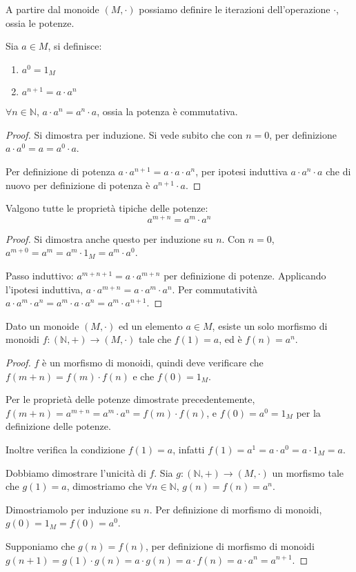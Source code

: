\begin{defn}[Potenze]
A partire dal monoide $(M, \cdot)$ possiamo definire le iterazioni dell'operazione $\cdot$, ossia le potenze.

Sia $ a \in M$, si definisce:
\begin{enumerate}
    \item $a^0 = 1_M$
    \item $a^{n+1} = a \cdot a^{n}$
\end{enumerate}
\end{defn}
\begin{prop}
$\forall n \in \mathbb{N}$, $a \cdot a^n = a^n \cdot a$, ossia la potenza \`e commutativa.
\end{prop}
\begin{proof}
Si dimostra per induzione. Si vede subito che con $n = 0$, per definizione $a \cdot a^0 = a = a^0 \cdot a$.

Per definizione di potenza $a \cdot a^{n+1} = a \cdot a \cdot a^{n} $, per ipotesi induttiva $ a \cdot a^n \cdot a $ che di nuovo per definizione di potenza \`e $ a^{n+1} \cdot a$.
\end{proof}
\begin{prop}
Valgono tutte le propriet\`a tipiche delle potenze:
\[
a^{m + n} = a^m \cdot a^n
\]
\end{prop}
\begin{proof}
Si dimostra anche questo per induzione su $n$. Con $n = 0$, $a^{m+0} = a^m = a^m \cdot 1_M = a^m \cdot a^0$.

Passo induttivo: $a^{m + n + 1} = a \cdot a^{m + n}$ per definizione di potenze. Applicando l'ipotesi induttiva, $a \cdot a^{m + n} = a \cdot a^m \cdot a^n$. Per commutativit\`a $a \cdot a^m \cdot a^n = a^m \cdot a \cdot a^n = a^m \cdot a^{n+1}$.
\end{proof}

\begin{theorem}
Dato un monoide $(M, \cdot)$ ed un elemento $a \in M$, esiste un solo morfismo di monoidi $f : (\mathbb{N}, +) \to (M, \cdot)$ tale che $f(1) = a$, ed \`e $f(n) = a^n$.
\end{theorem}
\begin{proof}
$f$ \`e un morfismo di monoidi, quindi deve verificare che $f(m+n) = f(m) \cdot f(n)$ e che $f(0) = 1_M$. 

Per le propriet\`a delle potenze dimostrate precedentemente, $f(m+ n) = a^{m+n} = a^m \cdot a^n = f(m) \cdot f(n)$, e $f(0) = a^0 = 1_M$ per la definizione delle potenze. 

Inoltre verifica la condizione $f(1) = a$, infatti $f(1) = a^1 = a \cdot a^0 = a \cdot 1_M = a$.

Dobbiamo dimostrare l'unicit\`a di $f$. Sia $g : (\mathbb{N}, +) \to (M, \cdot )$ un morfismo tale che $g(1) = a$, dimostriamo che $\forall n \in \mathbb{N} $, $ g(n) = f(n) = a^n$.

Dimostriamolo per induzione su $n$. Per definizione di morfismo di monoidi, $g(0) = 1_M = f(0) = a^0$.

Supponiamo che $g(n) = f(n)$, per definizione di morfismo di monoidi $g(n+1) = g(1) \cdot g(n) = a \cdot g(n) = a \cdot f(n) = a \cdot a^n = a^{n+1}$.
\end{proof}


